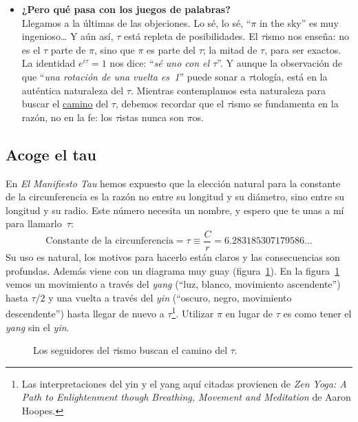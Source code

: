 \begin{itemize}
  \item \textbf{¿Pero qué pasa con los juegos de palabras?} \\ Llegamos a la últimas de las objeciones. Lo sé, lo sé, ``$\pi$ in the sky'' es muy ingenioso\ldots
Y aún así, $\tau$ está repleta de posibilidades. El $\tau$ismo nos enseña: no es el $\tau$ parte de $\pi$, sino que $\pi$ es parte del $\tau$; la mitad de $\tau$, para ser exactos. La identidad $e^{i\tau} = 1$ nos dice: ``\emph{sé uno con el $\tau$}''. Y aunque la observación de que ``\emph{una rotación de una vuelta es~1}'' puede sonar a $\tau$tología, está en la auténtica naturaleza del $\tau$. Mientras contemplamos esta naturaleza para buscar el \href{https://es.wikipedia.org/wiki/Tao}{camino} del $\tau$, debemos recordar que el $\tau$ismo se fundamenta en la razón, no en la fe: los $\tau$istas nunca son $\pi$os.


\end{itemize}


  \subsection{Acoge el tau} %
  \label{sec:embrace_the_tau}

En \emph{El Manifiesto Tau} hemos expuesto que la elección natural para la constante de la circunferencia es la razón no entre su longitud y su diámetro, sino entre su longitud y su radio. Este número necesita un nombre, y espero que te unas a mí para llamarlo~$\tau$:
\[
  \mbox{Constante de la circunferencia} = \tau \equiv \frac{C}{r} = 6.283185307179586\ldots
\]
Su uso es natural, los motivos para hacerlo están claros y las consecuencias son profundas. Además viene con un diagrama muy guay (figura~\ref{fig:tauism}). En la figura~\ref{fig:tauism} vemos un movimiento a través del \emph{yang} (``luz, blanco, movimiento ascendente'') hasta $\tau/2$ y una vuelta a través del \emph{yin} (``oscuro, negro, movimiento descendente'') hasta llegar de nuevo a $\tau$\footnote{Las interpretaciones del yin y el yang aquí citadas provienen de \emph{Zen Yoga: A Path to Enlightenment though Breathing, Movement and Meditation} de Aaron Hoopes.}. Utilizar $\pi$ en lugar de $\tau$ es como tener el \emph{yang} sin el \emph{yin}.

\begin{figure}
\begin{center}
\end{center}
\caption{Los seguidores del $\tau$ismo buscan el camino del $\tau$.\label{fig:tauism}}
\end{figure}

